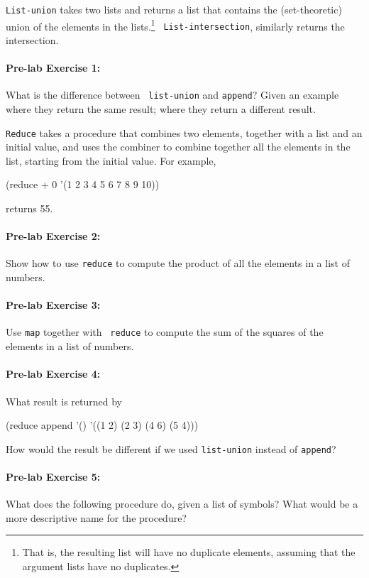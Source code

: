 {\tt List-union} takes two lists and returns a list that contains the
(set-theoretic) union of the elements in the lists.\footnote{That is,
the resulting list will have no duplicate elements, assuming that the
argument lists have no duplicates.}   {\tt
List-intersection}, similarly returns the intersection.

\paragraph{Pre-lab Exercise 1:} What is the difference between {\tt
list-union} and {\tt append}?  Given an example where they return the
same result; where they return a different result.


{\tt Reduce} takes a procedure that combines two elements, together
with a list and an initial value, and uses the combiner to combine
together all the elements in the list, starting from the initial
value.  For example,

\beginlisp
(reduce + 0 '(1 2 3 4 5 6 7 8 9 10))
\endlisp

\noindent
returns 55.

\paragraph{Pre-lab Exercise 2:} Show how to use {\tt reduce} to compute the
product of all the elements in a list of numbers.

\paragraph{Pre-lab Exercise 3:} Use {\tt map} together with {\tt
reduce} to compute the sum of the squares of the elements in a list of
numbers. 

\paragraph{Pre-lab Exercise 4:} What result is returned by

\beginlisp
(reduce append '() '((1 2) (2 3) (4 6) (5 4)))
\endlisp

\noindent
How would the result be different if we used {\tt list-union} instead
of {\tt append}?

\paragraph{Pre-lab Exercise 5:} What does the following procedure do,
given a list of symbols?  What would be a more descriptive name for the
procedure?

